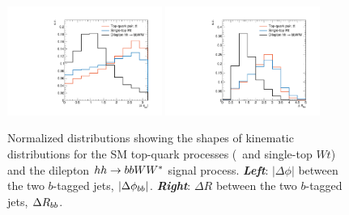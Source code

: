 \begin{figure}[!htb]
    \begin{center}
        \includegraphics[width=0.45\textwidth]{figures/search_hh/signal_pheno/shape_plots/hh_shape_plot_dphi_bb}
        \includegraphics[width=0.45\textwidth]{figures/search_hh/signal_pheno/shape_plots/hh_shape_plot_dRbb}
        \caption{
            Normalized distributions showing the shapes of kinematic distributions for the SM
            top-quark processes (\ttbar~and single-top $Wt$) and the dilepton $hh \rightarrow bbWW^*$ signal process.
            \textit{\textbf{Left}}: $|\Delta \phi|$ between the two $b$-tagged jets, $|\Delta \phi_{bb}|$.
            \textit{\textbf{Right}}: $\Delta R$ between the two $b$-tagged jets, $\Delta R_{bb}$.
        }
        \label{fig:hh_kin_0}
    \end{center}
\end{figure}

